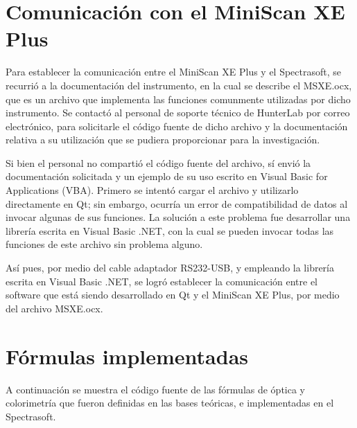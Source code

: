 \section{Comunicaci\'{o}n con el MiniScan XE Plus}

	Para establecer la comunicaci\'{o}n entre el MiniScan XE Plus y el Spectrasoft, se recurri\'{o} a la documentaci\'{o}n del instrumento, en la cual se describe el MSXE.ocx, que es un archivo que implementa las funciones comunmente utilizadas por dicho instrumento. Se contact\'{o} al personal de soporte t\'{e}cnico de HunterLab por correo electr\'{o}nico, para solicitarle el c\'{o}digo fuente de dicho archivo y la documentaci\'{o}n relativa a su utilizaci\'{o}n que se pudiera proporcionar para la investigaci\'{o}n.
	
	Si bien el personal no comparti\'{o} el c\'{o}digo fuente del archivo, s\'{i} envi\'{o} la documentaci\'{o}n solicitada y un ejemplo de su uso escrito en Visual Basic for Applications (VBA). Primero se intent\'{o} cargar el archivo y utilizarlo directamente en Qt; sin embargo, ocurr\'{i}a un error de compatibilidad de datos al invocar algunas de sus funciones. La soluci\'{o}n a este problema fue desarrollar una librer\'{i}a escrita en Visual Basic .NET, con la cual se pueden invocar todas las funciones de este archivo sin problema alguno.

	As\'{i} pues, por medio del cable adaptador RS232-USB, y empleando la librer\'{i}a escrita en Visual Basic .NET, se logr\'{o} establecer la comunicaci\'{o}n entre el software que est\'{a} siendo desarrollado en Qt y el MiniScan XE Plus, por medio del archivo MSXE.ocx.

\section{F\'{o}rmulas implementadas}
	A continuaci\'{o}n se muestra el c\'{o}digo fuente de las f\'{o}rmulas de \'{o}ptica y colorimetr\'{i}a que fueron definidas en las bases te\'{o}ricas, e implementadas en el Spectrasoft.
	
